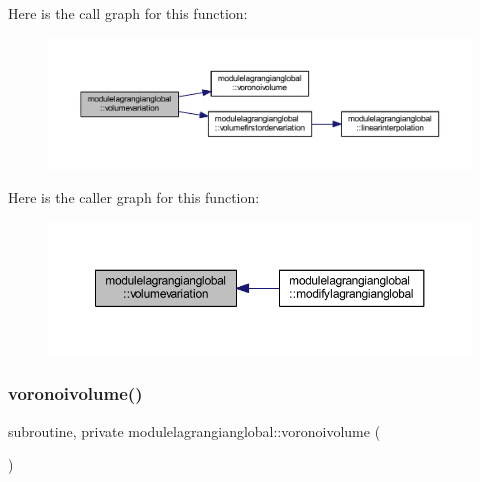 Here is the call graph for this function\+:\nopagebreak
\begin{figure}[H]
\begin{center}
\leavevmode
\includegraphics[width=350pt]{namespacemodulelagrangianglobal_af49b1a80eb0ff491949cf2b360fb430f_cgraph}
\end{center}
\end{figure}
Here is the caller graph for this function\+:\nopagebreak
\begin{figure}[H]
\begin{center}
\leavevmode
\includegraphics[width=350pt]{namespacemodulelagrangianglobal_af49b1a80eb0ff491949cf2b360fb430f_icgraph}
\end{center}
\end{figure}
\mbox{\label{namespacemodulelagrangianglobal_a302b214901c2710b5755117530d28d20}} 
\subsubsection{\texorpdfstring{voronoivolume()}{voronoivolume()}}
{\footnotesize\ttfamily subroutine, private modulelagrangianglobal\+::voronoivolume (\begin{DoxyParamCaption}{ }\end{DoxyParamCaption})\hspace{0.3cm}{\ttfamily [private]}}


